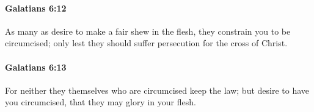 		\paragraph{Galatians 6:12} %
			\label{GALATIANS-6-12}

			As many as desire to make a fair shew in the flesh, they constrain you to be circumcised; only lest they should suffer persecution for the cross of Christ.

			\begin{framed}
			\scriptsize
				\begin{compactdesc}
					\item[SBLG] 
				\end{compactdesc}
			\end{framed}

		\paragraph{Galatians 6:13} %
			\label{GALATIANS-6-13}

			For neither they themselves who are circumcised keep the law; but desire to have you circumcised, that they may glory in your flesh.

